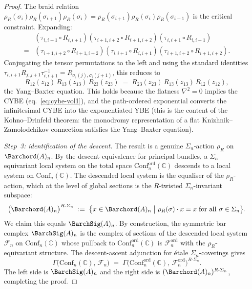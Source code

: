 \begin{proof}
The braid relation
$\rho_R(\sigma_i)\rho_R(\sigma_{i+1})\rho_R(\sigma_i)
=\rho_R(\sigma_{i+1})\rho_R(\sigma_i)\rho_R(\sigma_{i+1})$
is the critical constraint. Expanding:
\begin{align*}
&(\tau_{i,i+1}\circ R_{i,i+1})
(\tau_{i+1,i+2}\circ R_{i+1,i+2})
(\tau_{i,i+1}\circ R_{i,i+1}) \\
={}&
(\tau_{i+1,i+2}\circ R_{i+1,i+2})
(\tau_{i,i+1}\circ R_{i,i+1})
(\tau_{i+1,i+2}\circ R_{i+1,i+2}).
\end{align*}
Conjugating the tensor permutations to the left and using the
standard identities
$\tau_{i,i+1}R_{j,j+1}\tau_{i,i+1}^{-1}=R_{\sigma_i(j),\sigma_i(j+1)}$,
this reduces to
\[
R_{12}(z_{12})\,R_{13}(z_{13})\,R_{23}(z_{23})
\;=\;
R_{23}(z_{23})\,R_{13}(z_{13})\,R_{12}(z_{12}),
\]
the Yang--Baxter equation. This holds because the flatness
$\nabla^2=0$ implies the CYBE
(eq.~\eqref{eq:cybe-vol1}), and the path-ordered exponential
converts the infinitesimal CYBE into the exponentiated YBE
(this is the content of the Kohno--Drinfeld theorem: the
monodromy representation of a flat Knizhnik--Zamolodchikov connection
satisfies the Yang--Baxter equation).

\emph{Step~3: identification of the descent.}
The result is a genuine $\Sigma_n$-action $\rho_R$ on
$\Barchord(A)_n$. By the descent equivalence for
principal bundles, a $\Sigma_n$-equivariant local system on
the total space $\mathrm{Conf}_n^{\mathrm{ord}}(\mathbb{C})$
descends to a local system on
$\mathrm{Conf}_n(\mathbb{C})$. The descended local system
is the equaliser of the $\rho_R$-action, which at the level of
global sections is the $R$-twisted $\Sigma_n$-invariant subspace:
\[
\bigl(\Barchord(A)_n\bigr)^{R\text{-}\Sigma_n}
\;:=\;
\bigl\{
x\in\Barchord(A)_n
\;\big|\;
\rho_R(\sigma)\cdot x=x
\;\text{for all }\sigma\in\Sigma_n
\bigr\}.
\]
We claim this equals $\BarchSig(A)_n$. By construction, the symmetric
bar complex $\BarchSig(A)_n$ is the complex of sections of the descended
local system $\mathcal{F}_n$ on $\mathrm{Conf}_n(\mathbb{C})$
whose pullback to $\mathrm{Conf}_n^{\mathrm{ord}}(\mathbb{C})$ is
$\mathcal{F}_n^{\mathrm{ord}}$ with the $\rho_R$-equivariant structure.
The descent-ascent adjunction for \'etale $\Sigma_n$-coverings gives
\[
\Gamma\bigl(\mathrm{Conf}_n(\mathbb{C}),\,\mathcal{F}_n\bigr)
\;=\;
\Gamma\bigl(
\mathrm{Conf}_n^{\mathrm{ord}}(\mathbb{C}),\,
\mathcal{F}_n^{\mathrm{ord}}\bigr)^{R\text{-}\Sigma_n}.
\]
The left side is $\BarchSig(A)_n$ and the right side is
$(\Barchord(A)_n)^{R\text{-}\Sigma_n}$,
completing the proof.
\end{proof}

